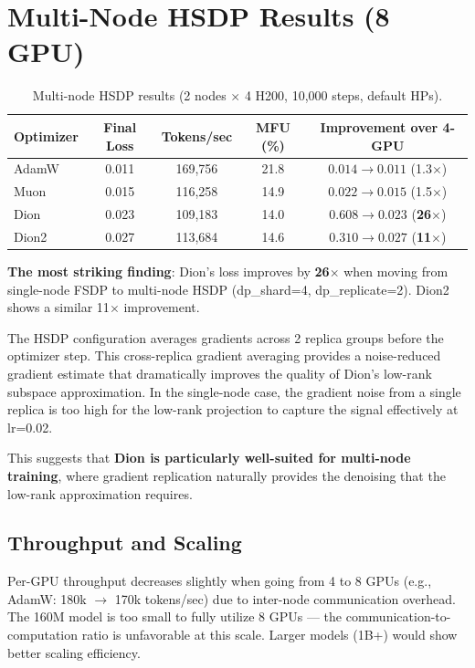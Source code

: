 \documentclass[11pt,a4paper]{article}
\begin{document}
\section{Multi-Node HSDP Results (8 GPU)}

\begin{table}[H]
\centering
\caption{Multi-node HSDP results (2 nodes $\times$ 4 H200, 10,000 steps, default HPs).}
\label{tab:multi}
\begin{tabular}{lcccc}
\toprule
\textbf{Optimizer} & \textbf{Final Loss} & \textbf{Tokens/sec} & \textbf{MFU (\%)} & \textbf{Improvement over 4-GPU} \\
\midrule
AdamW & 0.011 & 169,756 & 21.8 & $0.014 \to 0.011$ (1.3$\times$) \\
Muon  & 0.015 & 116,258 & 14.9 & $0.022 \to 0.015$ (1.5$\times$) \\
Dion  & 0.023 & 109,183 & 14.0 & $0.608 \to 0.023$ (\textbf{26$\times$}) \\
Dion2 & 0.027 & 113,684 & 14.6 & $0.310 \to 0.027$ (\textbf{11$\times$}) \\
\bottomrule
\end{tabular}
\end{table}

\noindent\textbf{The most striking finding}: Dion's loss improves by \textbf{26$\times$} when moving from single-node FSDP to multi-node HSDP (dp\_shard=4, dp\_replicate=2). Dion2 shows a similar 11$\times$ improvement.

The HSDP configuration averages gradients across 2 replica groups before the optimizer step. This cross-replica gradient averaging provides a noise-reduced gradient estimate that dramatically improves the quality of Dion's low-rank subspace approximation. In the single-node case, the gradient noise from a single replica is too high for the low-rank projection to capture the signal effectively at lr=0.02.

This suggests that \textbf{Dion is particularly well-suited for multi-node training}, where gradient replication naturally provides the denoising that the low-rank approximation requires.

\subsection{Throughput and Scaling}
Per-GPU throughput decreases slightly when going from 4 to 8 GPUs (e.g., AdamW: 180k $\to$ 170k tokens/sec) due to inter-node communication overhead. The 160M model is too small to fully utilize 8 GPUs --- the communication-to-computation ratio is unfavorable at this scale. Larger models (1B+) would show better scaling efficiency.
\end{document}
